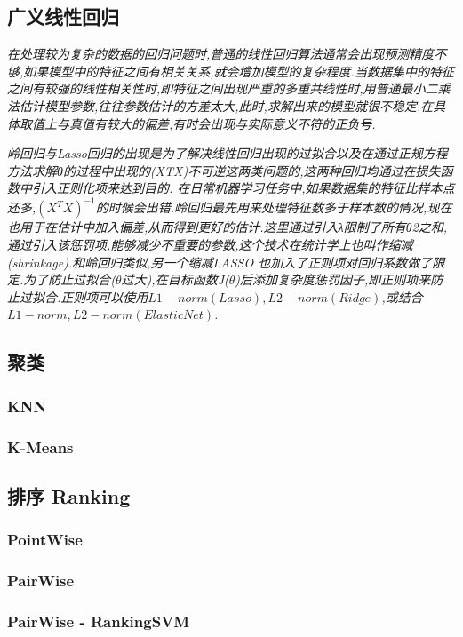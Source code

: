\documentclass{scrartcl}
\numberwithin{equation}{section}
\begin{document}
\subsection{广义线性回归}

\textsl{在处理较为复杂的数据的回归问题时,普通的线性回归算法通常会出现预测精度不够,如果模型中的特征之间有相关关系,就会增加模型的复杂程度.当数据集中的特征之间有较强的线性相关性时,即特征之间出现严重的多重共线性时,用普通最小二乘法估计模型参数,往往参数估计的方差太大,此时,求解出来的模型就很不稳定.在具体取值上与真值有较大的偏差,有时会出现与实际意义不符的正负号.}


\textsl{岭回归与Lasso回归的出现是为了解决线性回归出现的过拟合以及在通过正规方程方法求解θ的过程中出现的(XTX)不可逆这两类问题的,这两种回归均通过在损失函数中引入正则化项来达到目的.
在日常机器学习任务中,如果数据集的特征比样本点还多,$(X^TX)^{-1}$的时候会出错.岭回归最先用来处理特征数多于样本数的情况,现在也用于在估计中加入偏差,从而得到更好的估计.这里通过引入λ限制了所有θ2之和,通过引入该惩罚项,能够减少不重要的参数,这个技术在统计学上也叫作缩减(shrinkage).和岭回归类似,另一个缩减LASSO 也加入了正则项对回归系数做了限定.为了防止过拟合($\theta$过大),在目标函数J($\theta$)后添加复杂度惩罚因子,即正则项来防止过拟合.正则项可以使用$L1-norm(Lasso),L2-norm(Ridge)$,或结合$L1-norm,L2-norm(Elastic Net)$.}
\subsection{聚类}
\subsubsection{KNN}
\subsubsection{K-Means}
\subsection{排序 Ranking}
\subsubsection{PointWise}
\subsubsection{PairWise}
\subsubsection{PairWise - RankingSVM}
\end{document}

